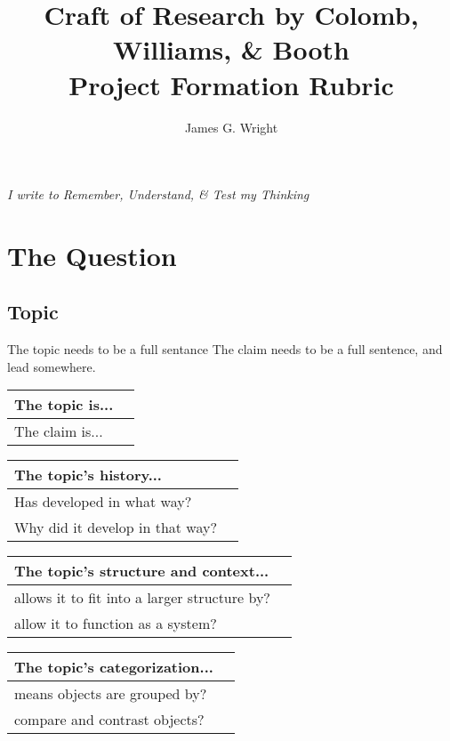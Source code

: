 \documentclass[10pt, a4paper]{article}
\begin{document}
\title{Craft of Research by Colomb, Williams, \& Booth\cite{booth2009craft}
	\\Project Formation Rubric}
\author{James G. Wright }
\maketitle
\begin{center}
	\emph{I write to Remember, Understand, \& Test my Thinking}
\end{center}

\newpage
\section{The Question}
\subsection{Topic}
The topic needs to be a full sentance
The claim needs to be a full sentence, and lead somewhere.
\begin{center}
	\begin{tabular}{|l |l|}
		\hline
		The topic is... &\\
		\hline 
		The claim is... &\\ 
		\hline
	\end{tabular}
\end{center}
\begin{center}
	\begin{tabular}{|l |l|}
		\hline
		The topic's history... &\\
		\hline 
		 Has developed in what way?&\\ 
		\hline
		Why did it develop in that way?&\\
		\hline
	\end{tabular}
\end{center}
\begin{center}
	\begin{tabular}{|l |l|}
		\hline
		The topic's structure and context... &\\
		\hline 
		allows it to fit into a larger structure by?&\\ 
		\hline
		allow it to function as a system?&\\
		\hline
	\end{tabular}
\end{center}

\begin{center}
	\begin{tabular}{|l |l|}
		\hline
		The topic's categorization... &\\
		\hline 
		means objects are grouped by?&\\ 
		\hline
		compare and contrast objects?&\\
		\hline
	\end{tabular}
\end{center}
\end{document}
